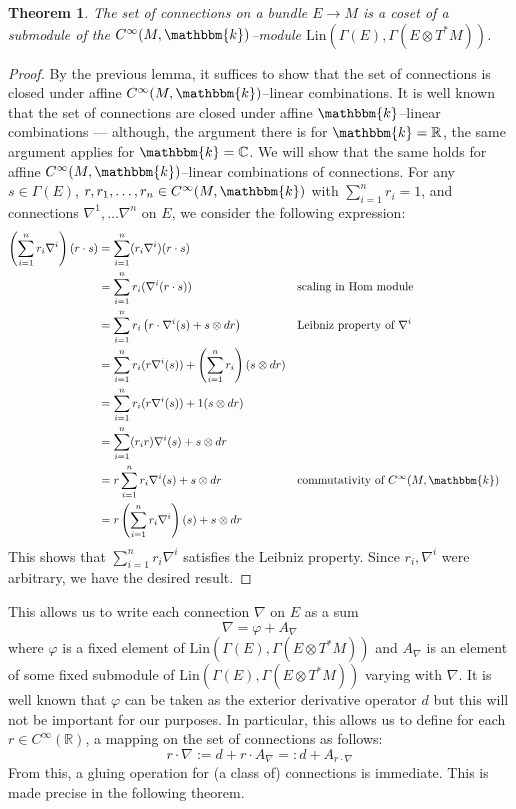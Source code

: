 \documentclass{amsart}
\newcommand{\R}{\mathbb{R}}
\newcommand{\C}{\mathbb{C}}
\newcommand{\K}{\mathbbm{k}}
\newcommand{\tensor}{\otimes}
\renewcommand{\to}[1][]{\stackrel{#1}{\longrightarrow}}
\newcommand{\br}[1]{\left( #1 \right)}
\newcommand{\Lin}{\textrm{Lin}}
\newcommand{\Hom}{\text{Hom}}
\newcommand{\Cinf}{C^{\infty}}
\newtheorem{thm}{Theorem}
\numberwithin{thm}{section}
\theoremstyle{definition}
\begin{document}
\begin{thm}
The set of connections on a bundle $E \to M$ is a coset of a submodule of the
$\Cinf(M, \K)$--module $\Lin\br{\Gamma(E), \Gamma(E \tensor T^*M)}$.
\end{thm}
\begin{proof}
By the previous lemma, it suffices to show that the set of connections
is closed under affine $\Cinf(M, \K)$--linear combinations.
It is well known that the set of connections are closed under affine
$\K$--linear combinations \cite[10.5, p. 73]{LT17} --- although, the argument
there is for $\K = \R$, the same argument applies for $\K = \C$. We will show
that the same holds for affine $\Cinf(M, \K)$--linear combinations
of connections. For any $s \in \Gamma(E)$,
$r, r_1, \dots, r_n \in \Cinf(M, \K)$ with $\sum_{i = 1}^n r_i = 1$,
and connections $\nabla^1, \dots \nabla^n$ on $E$, we consider the following
expression:
\begin{align*}
\br{\sum_{i = 1}^n r_i\nabla^i}(r \cdot s)
&= \sum_{i = 1}^n (r_i\nabla^i)(r \cdot s) \\
&= \sum_{i = 1}^n r_i (\nabla^i(r \cdot s))
  && \text{scaling in $\Hom$ module} \\
&= \sum_{i = 1}^n r_i \br{r \cdot \nabla^i(s) + s \tensor dr}
  && \text{Leibniz property of $\nabla^i$} \\
&= \sum_{i = 1}^n r_i (r \nabla^i(s))
    + \br{\sum_{i = 1}^{n} r_i}(s \tensor dr) \\
&= \sum_{i = 1}^n r_i (r \nabla^i(s))
    + 1(s \tensor dr) \\
&= \sum_{i = 1}^n (r_i r) \nabla^i(s)
    + s \tensor dr \\
&= r \sum_{i = 1}^n r_i \nabla^i(s)
    + s \tensor dr
  && \text{commutativity of $\Cinf(M, \K)$} \\
&= r \br{\sum_{i = 1}^n r_i \nabla^i}(s)
    + s \tensor dr
\end{align*}
This shows that $\sum_{i = 1}^{n} r_i \nabla^i$ satisfies the Leibniz property.
Since $r_i, \nabla^i$ were arbitrary, we have the desired result.
\end{proof}

This allows us to write each connection $\nabla$ on
$E$ as a sum
\[
  \nabla = \varphi + A_{\nabla}
\]
where $\varphi$ is a fixed element of $\Lin(\Gamma(E), \Gamma(E \tensor T^*M))$
and $A_{\nabla}$ is an element of some fixed submodule of
$\Lin(\Gamma(E), \Gamma(E \tensor T^*M))$ varying with $\nabla$.
It is well known that
$\varphi$ can be taken as the exterior derivative operator $d$ but this will not
be important for our purposes. In particular,
this allows us to define for each $r \in \Cinf(\R)$, a mapping
on the set of connections as follows:
\[
  r \cdot \nabla := d + r \cdot A_{\nabla} =: d + A_{r \cdot \nabla}
\]
From this, a gluing operation for (a class of) connections is immediate. This
is made precise in the following theorem.
\end{document}
